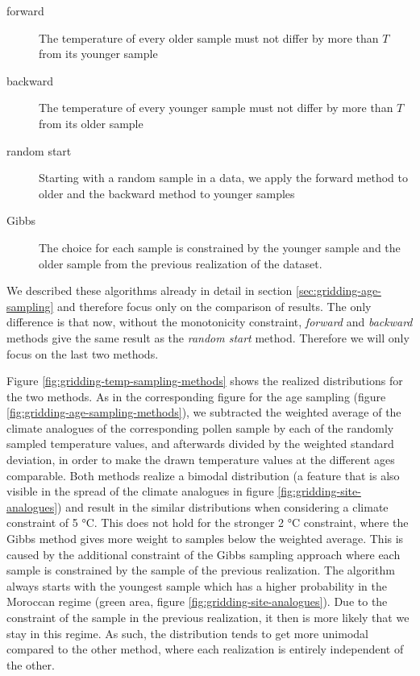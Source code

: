 \documentclass[
11pt, %
english, %
singlespacing, %
headsepline, %
]{MastersDoctoralThesis} %
\begin{document}
\begin{NoHyper}
\begin{refsection}
\begin{description}
	\item[forward] The temperature of every older sample must not differ by more than $T$ from its younger sample
	\item[backward] The temperature of every younger sample must not differ by more than $T$ from its older sample
	\item[random start] Starting with a random sample in a data, we apply the forward method to older and the backward method to younger samples
	\item[Gibbs] The choice for each sample is constrained by the younger sample and the older sample from the previous realization of the dataset.
\end{description}

We described these algorithms already in detail in section \ref{sec:gridding-age-sampling} and therefore focus only on the comparison of results. The only difference is that now, without the monotonicity constraint, \textit{forward} and \textit{backward} methods give the same result as the \textit{random start} method. Therefore we will only focus on the last two methods.

Figure \ref{fig:gridding-temp-sampling-methods} shows the realized distributions for the two methods. As in the corresponding figure for the age sampling (figure \ref{fig:gridding-age-sampling-methods}), we subtracted the weighted average of the climate analogues of the corresponding pollen sample by each of the randomly sampled temperature values, and afterwards divided by the weighted standard deviation, in order to make the drawn temperature values at the different ages comparable. Both methods realize a bimodal distribution (a feature that is also visible in the spread of the climate analogues in figure \ref{fig:gridding-site-analogues}) and result in the similar distributions when considering a climate constraint of 5 °C. This does not hold for the stronger 2 °C constraint, where the Gibbs method gives more weight to samples below the weighted average. This is caused by the additional constraint of the Gibbs sampling approach where each sample is constrained by the sample of the previous realization. The algorithm always starts with the youngest sample which has a higher probability in the Moroccan regime (green area, figure \ref{fig:gridding-site-analogues}). Due to the constraint of the sample in the previous realization, it then is more likely that we stay in this regime. As such, the distribution tends to get more unimodal compared to the other method, where each realization is entirely independent of the other.


\end{refsection}
\end{NoHyper}
\end{document}
